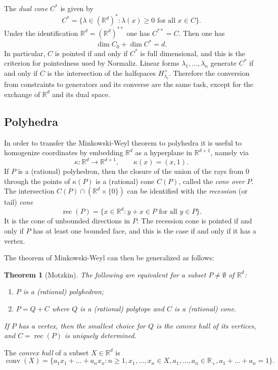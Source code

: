 \documentclass[12pt,a4paper]{scrartcl}
\newtheorem{theorem}{Theorem}
\theoremstyle{definition}
\def\RR{{\mathbb R}}
\DeclareMathOperator{\conv}{conv}
\DeclareMathOperator{\rec}{rec}
\begin{document}
The \emph{dual cone} $C^*$ is given by
$$
C^*=\{\lambda\in (\RR^d)^*:\lambda(x)\ge0 \text{ for all } x\in C\}.
$$
Under the identification $\RR^d=(\RR^d)^{**}$ one has $C^{**}=C$. Then one has
$$
\dim C_0+\dim C^*=d.
$$
In particular, $C$ is pointed if and only if $C^*$ is full dimensional, and this is the criterion for pointedness used by Normaliz. Linear forms $\lambda_1,\dots,\lambda_n$ generate $C^*$ if and only if $C$ is the intersection of the halfspaces $H_{\lambda_i}^+$. Therefore the conversion from constraints to generators and its converse are the same task, except for the exchange of $\RR^d$ and its dual space.

\subsection{Polyhedra}

In order to transfer the Minkowski-Weyl theorem to polyhedra it is useful to homogenize coordinates by embedding $\RR^d$ as a hyperplane in $\RR^{d+1}$, namely via
$$
\kappa:\RR^d\to\RR^{d+1},\qquad \kappa(x)=(x,1).
$$
If $P$ is a (rational) polyhedron, then the closure of the union of the rays from $0$ through the points of $\kappa(P)$ is a (rational) cone $C(P)$, called the \emph{cone over} $P$. The intersection $C(P)\cap(\RR^d\times\{0\})$ can be identified with the \emph{recession} (or tail) \emph{cone}
$$
\rec(P)=\{x\in\RR^d: y+x\in P\text{ for all } y\in P\}.
$$
It is the cone of unbounded directions in $P$. The recession cone is pointed if and only if $P$ has at least one bounded face, and this is the case if and only if it has a vertex.

The theorem of Minkowski-Weyl can then be generalized as follows:

\begin{theorem}[Motzkin]
	The following are equivalent for a subset $P\neq\emptyset$ of $\RR^d$:
	\begin{enumerate}
		\item $P$ is a (rational) polyhedron;
		\item $P=Q+C$ where $Q$ is a (rational) polytope and $C$ is a (rational) cone.
	\end{enumerate}
	If $P$ has a vertex, then the smallest choice for $Q$ is the convex hull of its vertices, and $C=\rec(P)$ is uniquely determined.
\end{theorem}

The \emph{convex hull} of a subset $X\in\RR^d$ is
$$
\conv(X)=\{a_1x_1+\dots+a_nx_n: n\ge 1, x_1,\dots,x_n\in X, a_1,\dots,a_n\in\RR_+, a_1+\dots+a_n=1\}.
$$
\end{document}
